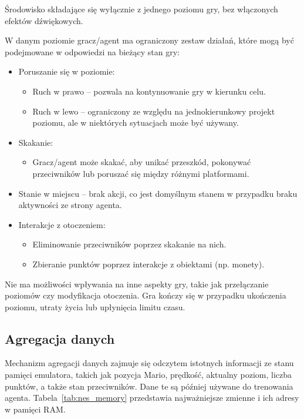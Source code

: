 Środowisko składające się wyłącznie z jednego poziomu gry, bez włączonych efektów dźwiękowych.

W danym poziomie gracz/agent ma ograniczony zestaw działań, które mogą być podejmowane w odpowiedzi na bieżący stan gry:
\begin{itemize}
	\item Poruszanie się w poziomie:
	      \begin{itemize}
		      \item Ruch w prawo – pozwala na kontynuowanie gry w kierunku celu.
		      \item Ruch w lewo – ograniczony ze względu na jednokierunkowy projekt poziomu, ale w niektórych sytuacjach może być używany.
	      \end{itemize}
	\item Skakanie:
	      \begin{itemize}
		      \item Gracz/agent może skakać, aby unikać przeszkód, pokonywać przeciwników lub poruszać się między różnymi platformami.
	      \end{itemize}
	\item Stanie w miejscu – brak akcji, co jest domyślnym stanem w przypadku braku aktywności ze strony agenta.
	\item Interakcje z otoczeniem:
	      \begin{itemize}
		      \item Eliminowanie przeciwników poprzez skakanie na nich.
		      \item Zbieranie punktów poprzez interakcje z obiektami (np. monety).
	      \end{itemize}
\end{itemize}

Nie ma możliwości wpływania na inne aspekty gry, takie jak przełączanie poziomów czy modyfikacja otoczenia. Gra kończy się w przypadku ukończenia poziomu, utraty życia lub upłynięcia limitu czasu.
\subsection{Agregacja danych}

Mechanizm agregacji danych zajmuje się odczytem istotnych informacji ze stanu pamięci emulatora, takich jak pozycja Mario, prędkość, aktualny poziom, liczba punktów, a także stan przeciwników. Dane te są później używane do trenowania agenta. Tabela~\ref{tab:nes_memory} przedstawia najważniejsze zmienne i ich adresy w pamięci RAM.

